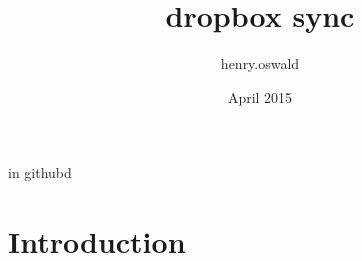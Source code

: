 \documentclass{article}
\title{dropbox sync}
\author{henry.oswald }
\date{April 2015}
\begin{document}
\maketitle
in githubd
\section{Introduction}
\end{document}
